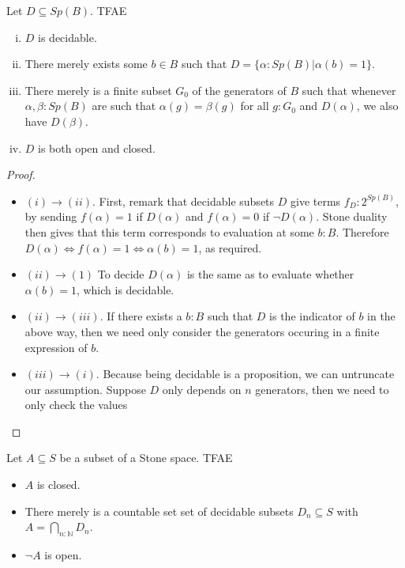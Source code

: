 \documentclass{../util/zariski-small}
\begin{document}
\begin{lemma}
  Let $D\subseteq Sp(B)$. TFAE
  \begin{enumerate}[(i)]
    \item $D$ is decidable. 
    \item There merely exists some $b\in B$ such that $D = \{\alpha:Sp(B) | \alpha(b) = 1\}$. 
    \item There merely is a finite subset $G_0$ of the generators of $B$ such that 
      whenever $\alpha,\beta:Sp(B)$ are such that 
      $\alpha(g) = \beta(g)$ for all $g:G_0$ and $D(\alpha)$, we also have $D(\beta)$. 
    \item $D$ is both open and closed. 
  \end{enumerate}
\end{lemma}
\begin{proof}
  \begin{itemize}
    \item $(i) \to (ii)$.
      First, remark that decidable subsets $D$ give terms $f_D:2^{Sp(B)}$, by sending 
      $f(\alpha) = 1$ if $D(\alpha)$ and $f(\alpha) = 0$ if $\neg D(\alpha)$. 
      Stone duality then gives that this term corresponds to evaluation at some $b:B$. 
      Therefore $D(\alpha) \iff f(\alpha) = 1 \iff  \alpha(b) = 1$, as required. 
    \item $(ii) \to (1)$
      To decide $D(\alpha)$ is the same as to evaluate whether $\alpha(b) = 1$, which is decidable. 
    \item $(ii) \to (iii)$. If there exists a $b:B$ such that $D$ is the indicator of $b$ in the above way, 
      then we need only consider the generators occuring in a finite expression of $b$. 
    \item $(iii) \to (i)$. Because being decidable is a proposition, we can untruncate our assumption. 
      Suppose $D$ only depends on $n$ generators, then we need to only check the values 
  \end{itemize}
\end{proof}
\begin{lemma}
  Let $A\subseteq S$ be a subset of a Stone space. TFAE
  \begin{itemize}
    \item $A$ is closed. 
    \item There merely is a countable set set of decidable subsets $D_n\subseteq S$ with 
      $A = \bigcap_{n:\mathbb N} D_n$. 
    \item $\neg A$ is open. 
  \end{itemize}
\end{lemma}
\end{document}
